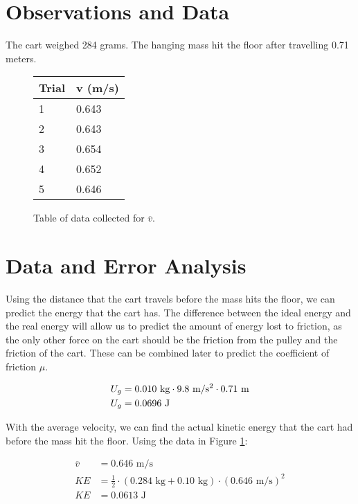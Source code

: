 \documentclass[twocolumn]{article}
\begin{document}
\section{Observations and Data}
The cart weighed 284 grams. The hanging mass hit the floor after travelling
0.71 meters.

\begin{figure}[h]
    \centering
    \begin{tabular}{| l | l |}
        \hline
        Trial & v (m/s) \\ \hline
        1 & 0.643 \\
        2 & 0.643 \\
        3 & 0.654 \\
        4 & 0.652 \\
        5 & 0.646 \\
        \hline
    \end{tabular}
    \caption{Table of data collected for $\overline{v}$.}
    \label{fig:v_data}
\end{figure}

\section{Data and Error Analysis}
Using the distance that the cart travels before the mass hits the floor, we can
predict the energy that the cart has. The difference between the ideal energy
and the real energy will allow us to predict the amount of energy lost to
friction, as the only other force on the cart should be the friction from the
pulley and the friction of the cart. These can be combined later to predict the
coefficient of friction $\mu$.

\begin{align}
    U_g &= 0.010 \text{ kg} \cdot 9.8 \text{ m/s\textsuperscript{2}} \cdot 0.71
        \text{ m} \\
    U_g &= 0.0696 \text{ J}
\end{align}

With the average velocity, we can find the actual kinetic energy that the cart
had before the mass hit the floor. Using the data in Figure \ref{fig:v_data}:

\begin{align}
    \overline{v} &= 0.646 \text{ m/s} \\
    KE &= \frac{1}{2} \cdot (0.284 \text{ kg} + 0.10 \text{ kg}) \cdot (0.646 \text{ m/s})^2 \\
    KE &= 0.0613 \text{ J}
\end{align}
\end{document}
